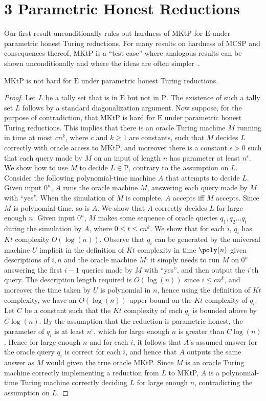 \section*{3 Parametric Honest Reductions}
Our first result unconditionally rules out hardness of MKtP for $\mathrm E$ under parametric honest Turing reductions. For many results on hardness of MCSP and consequences thereof, MKtP is a ``test case'' where analogous results can be shown unconditionally and where the ideas are often simpler~\cite{ref8,ref16}.
\begin{nttheorem}
MKtP is not hard for $\mathrm E$ under parametric honest Turing reductions.
\end{nttheorem}
\begin{proof}
Let $L$ be a tally set that is in $\mathrm E$ but not in $\mathrm P$. The existence of such a tally set $L$ follows by a standard diagonalization argument.
Now suppose, for the purpose of contradiction, that MKtP is hard for $\mathrm E$ under parametric honest Turing reductions. This implies that there is an oracle Turing machine $M$ running in time at most $cn^k$, where $c$ and $k\geq1$ are constants, such that $M$ decides $L$ correctly with oracle access to MKtP, and moreover there is a constant $\epsilon>0$ such that each query made by $M$ on an input of length $n$ has parameter at least $n^\epsilon$. We show how to use $M$ to decide $L\in\mathrm P$, contrary to the assumption on $L$.
Consider the following polynomial-time machine $A$ that attempts to decide $L$. Given input $0^n$, $A$ runs the oracle machine $M$, answering each query made by $M$ with ``yes''. When the simulation of $M$ is complete, $A$ accepts iff $M$ accepts. Since $M$ is polynomial-time, so is $A$. We show that $A$ correctly decides $L$ for large enough $n$.
Given input $0^n$, $M$ makes some sequence of oracle queries $q_1,q_2\ldots q_t$ during the simulation by $A$, where $0\leq t\leq cn^k$. We show that for each $i$, $q_i$ has $Kt$ complexity $O(\log(n))$. Observe that $q_i$ can be generated by the universal machine $U$ implicit in the definition of $Kt$ complexity in time $\poly(n)$ given descriptions of $i,n$ and the oracle machine $M$: it simply needs to run $M$ on $0^n$ answering the first $i-1$ queries made by $M$ with ``yes'', and then output the $i$'th query. The description length required is $O(\log(n))$ since $i\leq cn^k$, and moreover the time taken by $U$ is polynomial in $n$, hence using the definition of $Kt$ complexity, we have an $O(\log(n))$ upper bound on the $Kt$ complexity of $q_i$. Let $C$ be a constant such that the $Kt$ complexity of each $q_i$ is bounded above by $C\log(n)$.
By the assumption that the reduction is parametric honest, the parameter of $q_i$ is at least $n^\epsilon$, which for large enough $n$ is greater than $C\log(n)$. Hence for large enough $n$ and for each $i$, it follows that $A$'s assumed answer for the oracle query $q_i$ is correct for each $i$, and hence that $A$ outputs the same answer as $M$ would given the true oracle MKtP. Since $M$ is an oracle Turing machine correctly implementing a reduction from $L$ to MKtP, $A$ is a polynomial-time Turing machine correctly deciding $L$ for large enough $n$, contradicting the assumption on $L$.
\end{proof}
